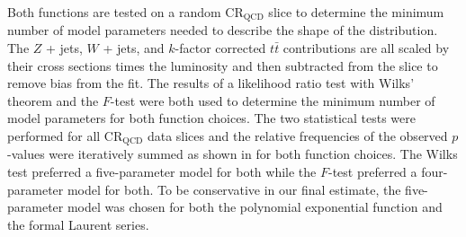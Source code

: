 Both functions are tested on a random $\text{CR}_{\text{QCD}}$ slice to
determine the minimum number of model parameters needed to describe the shape
of the distribution.  The $Z$ + jets, $W$ + jets, and $k$-factor corrected
$t\bar{t}$ contributions are all scaled by their cross sections times the
luminosity and then subtracted from the slice to remove bias from the fit.  The
results of a likelihood ratio test with Wilks' theorem \cite{wilks1938} and the
$F$-test \cite{snecdecor1991statistical} were both used to determine the
minimum number of model parameters for both function choices.  The two
statistical tests were performed for all $\text{CR}_{\text{QCD}}$ data slices
and the relative frequencies of the observed $p$-values were iteratively summed
as shown in  for both function choices.
The Wilks test preferred a five-parameter model for both while the $F$-test
preferred a four-parameter model for both.  To be conservative in our final
estimate, the five-parameter model was chosen for both the polynomial
exponential function and the formal Laurent series.


